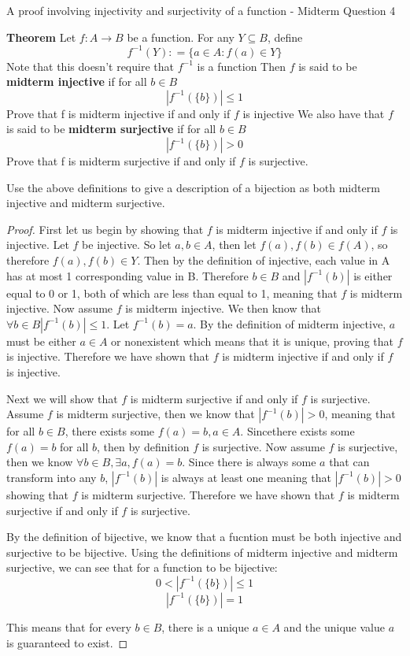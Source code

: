 A proof involving injectivity and surjectivity of a function - Midterm Question 4

\textbf{Theorem}
Let $f: A\rightarrow B$ be a function. For any $Y \subseteq B$, define
$$ f^{-1}(Y): = \{a \in A: f(a) \in Y\} $$
Note that this doesn't require that $f^{-1}$ is a function
Then $f$ is said to be \textbf{midterm injective} if for all $b \in B$
$$|f^{-1} (\{b\})| \leq 1 $$
Prove that f is midterm injective if and only if $f$ is injective
We also have that $f$ is said to be \textbf{midterm surjective} if for all $b \in B$
$$| f^{-1}(\{b\})| > 0 $$
Prove that f is midterm surjective if and only if $f$ is surjective.

Use the above definitions to give a description of a bijection as both midterm injective and midterm surjective.

\begin{proof}
First let us begin by showing that $f$ is midterm injective if and only if $f$ is injective.
Let $f$ be injective. So let $a,b \in A$, then let $f(a),f(b) \in f(A)$, so therefore $f(a),f(b) \in Y$. Then by the definition of injective, each value in A has at most 1 corresponding value in B. Therefore $b\in B$ and $|f^{-1} (b)|$ is either equal to 0 or 1, both of which are less than equal to 1, meaning that $f$ is midterm injective.
Now assume $f$ is midterm injective. We then know that $\forall b \in B  |f^{-1} (b)| \leq 1$. Let $f^{-1} (b) = a$. By the definition of midterm injective, $a$ must be either $a \in A$ or nonexistent which means that it is unique, proving that $f$ is injective. Therefore we have shown that $f$ is midterm injective if and only if $f$ is injective.

Next we will show that $f$ is midterm surjective if and only if $f$ is surjective. Assume $f$ is midterm surjective, then we know that $|f^{-1} (b)|  > 0$, meaning that for all $b \in B$, there exists some $f(a) = b, a \in A$. Sincethere exists some $f(a) = b$ for all $b$, then by definition $f$ is surjective.
Now assume $f$ is surjective, then we know $\forall b \in B, \exists a , f(a) = b$. Since there is always some $a$ that can transform into any $b$, $|f^{-1} (b)|$ is always at least one meaning that $|f^{-1} (b)| > 0$ showing that $f$ is midterm surjective.
Therefore we have shown that $f$ is midterm surjective if and only if $f$ is surjective.

By the definition of bijective, we know that a fucntion must be both injective and surjective to be bijective. Using the definitions of midterm injective and midterm surjective, we can see that for a function to be bijective: 
$$0 < | f^{-1}(\{b\})| \leq 1  $$
$$ | f^{-1}(\{b\})| = 1  $$

This means that for every $b\in B$, there is a unique $a\in A$ and the unique value $a$ is guaranteed to exist.
\end{proof}